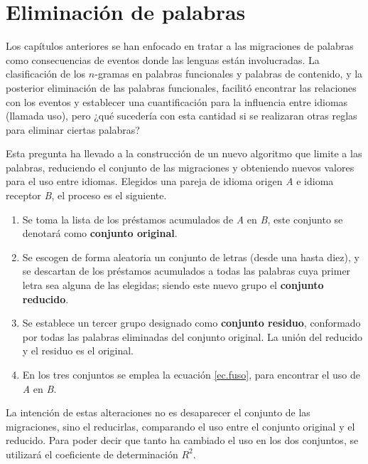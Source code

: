 \chapter{Eliminación de palabras}


Los capítulos anteriores se han enfocado en tratar a las migraciones de palabras como consecuencias de eventos donde  las lenguas están involucradas. La clasificación de los $n$-gramas en palabras funcionales y palabras de contenido, y la posterior eliminación de las palabras funcionales, facilitó encontrar las relaciones con los eventos y establecer una cuantificación para la influencia entre idiomas (llamada uso), pero ¿qué sucedería con esta cantidad si se realizaran otras reglas para eliminar ciertas palabras?

Esta pregunta ha llevado a la construcción de un nuevo algoritmo que limite a las palabras,  reduciendo el conjunto de las migraciones y obteniendo nuevos valores para el uso entre idiomas.  Elegidos una pareja de idioma origen \textit{A} e idioma receptor \textit{B}, el proceso es el siguiente. 


\begin{enumerate}
	
	\item Se toma la lista de los préstamos acumulados de \textit{A} en \textit{B},  este conjunto se denotará como \textbf{conjunto original}.
	
	\item Se escogen de forma aleatoria un conjunto de letras (desde una hasta diez), y se descartan de los préstamos acumulados a todas las palabras cuya primer letra sea alguna de las elegidas; siendo este nuevo grupo el \textbf{conjunto reducido}.
	
	\item Se establece un tercer grupo designado como \textbf{conjunto residuo}, conformado por todas las palabras eliminadas del conjunto original.  La unión del reducido y el residuo es el original. 
	
	\item En los tres conjuntos se emplea la ecuación \ref{ec.fuso}, para encontrar el uso de \textit{A} en \textit{B}. 	
	
\end{enumerate}

La intención de estas alteraciones no es desaparecer el conjunto de las migraciones, sino el reducirlas,   comparando el uso entre el conjunto original y el reducido.  Para poder decir que tanto ha cambiado el uso en los dos conjuntos, se utilizará el coeficiente de determinación $R^{2}$. 

